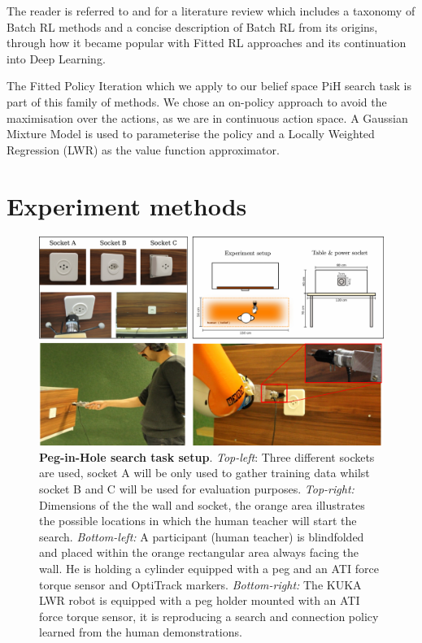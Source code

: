 \documentclass[final,5p,times,twocolumn]{elsarticle}
\begin{document}
The reader is referred to \cite{approx_rl_overview_2011} and \cite[Chap 2]{RL_state_art_2012} for a literature 
review which includes a taxonomy of Batch RL methods and a concise description of Batch RL from its origins, 
through how it became popular with Fitted RL approaches and its continuation into Deep Learning.

The Fitted Policy Iteration which we apply to our belief space PiH search task is part of this family of methods.
We chose an on-policy approach to avoid the maximisation over the actions, as we are in continuous action space.
A Gaussian Mixture Model is used to parameterise the policy and a Locally Weighted Regression (LWR) as 
the value function approximator.


\section{Experiment methods}\label{sec:experiment_methods}

\begin{figure}
 \centering
 \includegraphics[width=0.85\linewidth]{./Figure/Figure1.pdf}
 \caption{\textbf{Peg-in-Hole search task setup}.
  \textit{Top-left}: Three different sockets are used, socket A will be only used to gather training data whilst socket B and 
  C will be used for evaluation purposes.  \textit{Top-right:} Dimensions of the the wall and socket, the orange area illustrates the possible locations 
  in which the human teacher will start the search.
  \textit{Bottom-left:} A participant (human teacher) is blindfolded and  placed within the orange rectangular area always 
  facing the wall. He is holding a cylinder equipped with a peg and an  ATI force torque sensor and OptiTrack markers. 
  \textit{Bottom-right:} The KUKA LWR robot is equipped with a peg holder mounted with an ATI force torque sensor, it is reproducing a search 
  and connection policy learned from the human demonstrations.}
    \label{fig:search_task_setup}
\end{figure}
\end{document}
